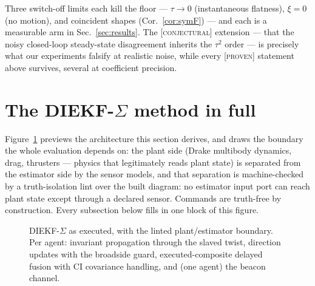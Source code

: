 \documentclass[letterpaper, 10pt, journal]{IEEEtran}
\newcommand{\provtag}{\textsc{[proven]}}
\newcommand{\conjtag}{\textsc{[conjectural]}}
\begin{document}
Three switch-off limits each kill the floor --- $\tau \to 0$ (instantaneous
flatness), $\xi = 0$ (no motion), and coincident shapes
(Cor.~\ref{cor:symF}) --- and each is a measurable arm in
Sec.~\ref{sec:results}. The \conjtag{} extension --- that the noisy
closed-loop steady-state disagreement inherits the $\tau^2$ order --- is
precisely what our experiments falsify at realistic noise, while every
\provtag{} statement above survives, several at coefficient precision.

\section{The DIEKF-$\Sigma$ method in full}\label{sec:method}
Figure~\ref{fig:arch} previews the architecture this section derives, and
draws the boundary the whole evaluation depends on: the plant side (Drake
multibody dynamics, drag, thrusters --- physics that legitimately reads plant
state) is separated from the estimator side by the sensor models, and that
separation is machine-checked by a truth-isolation lint over the built
diagram: no estimator input port can reach plant state except through a
declared sensor. Commands are truth-free by construction. Every subsection
below fills in one block of this figure.

\begin{figure}[t]
  \centering
  
  \caption{DIEKF-$\Sigma$ as executed, with the linted plant/estimator
  boundary. Per agent: invariant propagation through the slaved twist,
  direction updates with the broadside guard, executed-composite delayed
  fusion with CI covariance handling, and (one agent) the beacon channel.}
  \label{fig:arch}
\end{figure}
\end{document}
